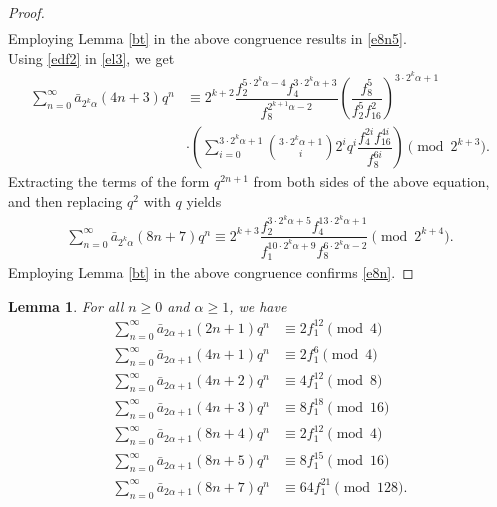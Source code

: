 \documentclass[11pt,a4paper]{article}
\numberwithin{equation}{section}
\theoremstyle{plain}
\newtheorem{lemma}[theorem]{Lemma}
\begin{document}
\begin{proof}
\begin{align*}
\end{align*}
Employing Lemma \ref{bt} in the above congruence results in \eqref{e8n5}.\\
\indent Using \eqref{edf2} in \eqref{el3}, we get
\begin{align*}
\sum_{n=0}^{\infty}\bar{a}_{2^k\alpha}(4n+3)q^n&\equiv2^{k+2}\dfrac{f_2^{5\cdot2^k\alpha-4}f_4^{3\cdot2^k\alpha+3}}{f_{8}^{2^{k+1}\alpha-2}}\left(\dfrac{f_8^5}{f_2^5f_{16}^2}\right)^{3\cdot2^k\alpha+1}\\
&\cdot\left(\sum_{i=0}^{3\cdot2^k\alpha+1}\binom{3\cdot2^k\alpha+1}{i}2^iq^i\dfrac{f_4^{2i}f_{16}^{4i}}{f_8^{6i}}\right)\pmod{2^{k+3}}.
\end{align*}
Extracting the terms of the form $q^{2n+1}$ from both sides of the above equation, and then replacing $q^{2}$ with $q$ yields
\begin{align*}
\sum_{n=0}^{\infty}\bar{a}_{2^k\alpha}(8n+7)q^n\equiv 2^{k+3}\dfrac{f_2^{3\cdot2^k\alpha+5}f_4^{13\cdot2^k\alpha+1}}{f_1^{10\cdot2^k\alpha+9}f_8^{6\cdot2^k\alpha-2}}\pmod{2^{k+4}}.	
\end{align*}
Employing Lemma \ref{bt} in the above congruence confirms \eqref{e8n}.
	\end{proof}
	\begin{lemma}\label{lgf2}
		For all $n\ge0$ and $\alpha\ge 1$, we have
	\begin{align}
		\sum_{n=0}^{\infty}\bar{a}_{2\alpha+1}(2n+1)q^n&\equiv 2f_1^{12}\pmod4\label{e2no}\\
		\sum_{n=0}^{\infty}\bar{a}_{2\alpha+1}(4n+1)q^n&\equiv 2f_1^{6}\pmod4\label{e4no}\\
		\sum_{n=0}^{\infty}\bar{a}_{2\alpha+1}(4n+2)q^n&\equiv 4f_1^{12}\pmod8\label{e4n2o}\\
		\sum_{n=0}^{\infty}\bar{a}_{2\alpha+1}(4n+3)q^n&\equiv 8f_1^{18}\pmod{16}\label{e4n3o}\\
		\sum_{n=0}^{\infty}\bar{a}_{2\alpha+1}(8n+4)q^n&\equiv 2f_1^{12}\pmod4\label{e8n4o}\\
		\sum_{n=0}^{\infty}\bar{a}_{2\alpha+1}(8n+5)q^n&\equiv 8f_1^{15}\pmod{16}\label{e8n5o}\\
	\sum_{n=0}^{\infty}\bar{a}_{2\alpha+1}(8n+7)q^n&\equiv 64f_1^{21}\pmod{128}\label{e8n7o}.
	\end{align}
\end{lemma}
\end{document}
